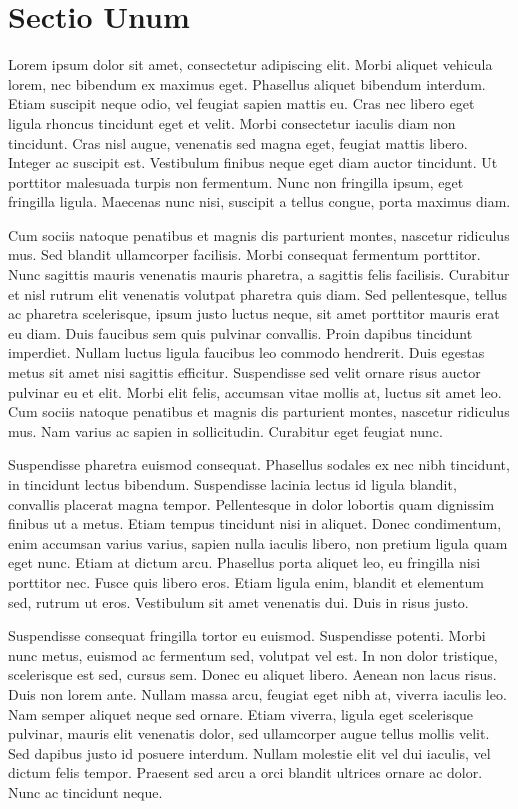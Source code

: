 \section{Sectio Unum}
Lorem ipsum dolor sit amet, consectetur adipiscing elit. Morbi aliquet vehicula lorem, nec bibendum ex maximus eget. Phasellus aliquet bibendum interdum. Etiam suscipit neque odio, vel feugiat sapien mattis eu. Cras nec libero eget ligula rhoncus tincidunt eget et velit. Morbi consectetur iaculis diam non tincidunt. Cras nisl augue, venenatis sed magna eget, feugiat mattis libero. Integer ac suscipit est. Vestibulum finibus neque eget diam auctor tincidunt. Ut porttitor malesuada turpis non fermentum. Nunc non fringilla ipsum, eget fringilla ligula. Maecenas nunc nisi, suscipit a tellus congue, porta maximus diam.

Cum sociis natoque penatibus et magnis dis parturient montes, nascetur ridiculus mus. Sed blandit ullamcorper facilisis. Morbi consequat fermentum porttitor. Nunc sagittis mauris venenatis mauris pharetra, a sagittis felis facilisis. Curabitur et nisl rutrum elit venenatis volutpat pharetra quis diam. Sed pellentesque, tellus ac pharetra scelerisque, ipsum justo luctus neque, sit amet porttitor mauris erat eu diam. Duis faucibus sem quis pulvinar convallis. Proin dapibus tincidunt imperdiet. Nullam luctus ligula faucibus leo commodo hendrerit. Duis egestas metus sit amet nisi sagittis efficitur. Suspendisse sed velit ornare risus auctor pulvinar eu et elit. Morbi elit felis, accumsan vitae mollis at, luctus sit amet leo. Cum sociis natoque penatibus et magnis dis parturient montes, nascetur ridiculus mus. Nam varius ac sapien in sollicitudin. Curabitur eget feugiat nunc.

Suspendisse pharetra euismod consequat. Phasellus sodales ex nec nibh tincidunt, in tincidunt lectus bibendum. Suspendisse lacinia lectus id ligula blandit, convallis placerat magna tempor. Pellentesque in dolor lobortis quam dignissim finibus ut a metus. Etiam tempus tincidunt nisi in aliquet. Donec condimentum, enim accumsan varius varius, sapien nulla iaculis libero, non pretium ligula quam eget nunc. Etiam at dictum arcu. Phasellus porta aliquet leo, eu fringilla nisi porttitor nec. Fusce quis libero eros. Etiam ligula enim, blandit et elementum sed, rutrum ut eros. Vestibulum sit amet venenatis dui. Duis in risus justo.

Suspendisse consequat fringilla tortor eu euismod. Suspendisse potenti. Morbi nunc metus, euismod ac fermentum sed, volutpat vel est. In non dolor tristique, scelerisque est sed, cursus sem. Donec eu aliquet libero. Aenean non lacus risus. Duis non lorem ante. Nullam massa arcu, feugiat eget nibh at, viverra iaculis leo. Nam semper aliquet neque sed ornare. Etiam viverra, ligula eget scelerisque pulvinar, mauris elit venenatis dolor, sed ullamcorper augue tellus mollis velit. Sed dapibus justo id posuere interdum. Nullam molestie elit vel dui iaculis, vel dictum felis tempor. Praesent sed arcu a orci blandit ultrices ornare ac dolor. Nunc ac tincidunt neque.

